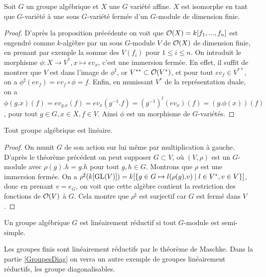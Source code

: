 \begin{thm}\label{embed}
Soit $G$ un groupe algébrique et $X$ une $G$ variété affine. $X$ est isomorphe en tant que $G$-variété à une sous $G$-variété fermée d'un $G$-module de dimension finie.
\end{thm}
\begin{proof}
D'après la proposition précédente on voit que $\mathcal{O}(X)=k[f_1,...,f_n]$ est engendré comme $k$-algèbre par un sous $G$-module $V$ de $\mathcal{O}(X)$ de dimension finie, en prenant par exemple la somme des $V(f_i)$ pour $1\leq i\leq n$. On introduit le morphisme $\phi:X\rightarrow V^*, x\mapsto ev_x$, c'est une immersion fermée. En effet, il suffit de montrer que $V$ est dans l'image de $\phi^\sharp$, or $V^{**}\subset \mathcal{O}(V^*)$, et pour tout $ev_f\in V^{**}$, on a $\phi^\sharp(ev_f)=ev_f\circ\phi=f$. Enfin, en munissant $V^*$ de la représentation duale, on a $\phi(g.x)(f)=ev_{g.x}(f)=ev_x( g^{-1}.f)=(g^{-1})^t(ev_x)(f)=(g.\phi(x))(f)$, pour tout $g\in G, x\in X,f\in V$. Ainsi $\phi$ est un morphisme de $G$-variétés.
\end{proof}

\begin{cor}
Tout groupe algébrique est linéaire.
\end{cor}
\begin{proof}
On munit $G$ de son action sur lui même par multiplication à gauche. D'après le théorème précédent on peut supposer $G\subset V$, où $(V,\rho)$ est un $G$-module avec $\rho(g).h=g.h$ pour tout $g,h\in G$. Montrons que $\rho$ est une immersion fermée. On a $\rho^\sharp(k[\operatorname{GL}(V)])=k[\lbrace g\in G\mapsto l(\rho(g).v)\mid l\in V^*,v\in V\rbrace]$, donc en prenant $v=e_G$, on voit que cette algèbre contient la restriction des fonctions de $\mathcal{O}(V)$ à $G$. Cela montre que $\rho^\sharp$ est surjectif car $G$ est fermé dans $V$.
\end{proof}

\begin{defn}
Un groupe algébrique $G$ est linéairement réductif si tout $G$-module est semi-simple.
\end{defn}

\begin{ex}
Les groupes finis sont linéairement réductifs par le théorème de Maschke. Dans la partie \ref{GroupesDiag} on verra un autre exemple de groupes linéairement réductifs, les groupe diagonalisables.
\end{ex}

